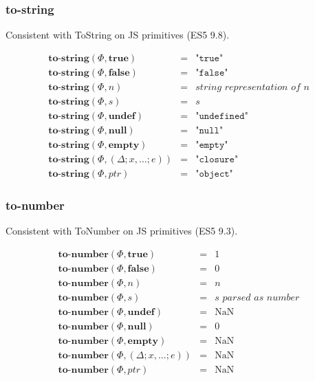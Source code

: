 \documentclass[draft, 10pt]{article}
\newcommand{\expr}[0]{e}
\newcommand{\var}[0]{x}
\newcommand{\num}[0]{n}
\newcommand{\str}[0]{s}
\newcommand{\nan}[0]{\textrm{NaN}}
\newcommand{\undef}[0]{\textbf{undef}}
\newcommand{\nul}[0]{\textbf{null}}
\newcommand{\empt}[0]{\textbf{empty}}
\newcommand{\true}[0]{\textbf{true}}
\newcommand{\false}[0]{\textbf{false}}
\newcommand{\optostr}[0]{\textbf{to-string}}
\newcommand{\optonum}[0]{\textbf{to-number}}
\newcommand{\varenv}[0]{\Delta}
\newcommand{\heap}[0]{\Phi}
\newcommand{\closure}[3]{(#1; #2; #3)}
\newcommand{\heapptr}{ptr}
\newcommand{\rununop}[3]{#1(#2,#3)}
\begin{document}
\subsubsection{to-string}

Consistent with ToString on JS primitives (ES5 9.8).

\[
\begin{array}{rcl}
\rununop{\optostr}{\heap}{\true} &=& \texttt{"true"} \\
\rununop{\optostr}{\heap}{\false} &=& \texttt{"false"} \\
\rununop{\optostr}{\heap}{\num} &=& \textit{string representation of $\num$} \\
\rununop{\optostr}{\heap}{\str} &=& \str \\
\rununop{\optostr}{\heap}{\undef} &=& \texttt{"undefined"} \\
\rununop{\optostr}{\heap}{\nul} &=& \texttt{"null"} \\
\rununop{\optostr}{\heap}{\empt} &=& \texttt{"empty"} \\
\rununop{\optostr}{\heap}{\closure{\varenv}{\var, \dots}{\expr}} &=& \texttt{"closure"} \\
\rununop{\optostr}{\heap}{\heapptr} &=& \texttt{"object"} 
\end{array}
\]

\subsubsection{to-number}

Consistent with ToNumber on JS primitives (ES5 9.3).

\[
\begin{array}{rcl}
\rununop{\optonum}{\heap}{\true} &=& 1 \\
\rununop{\optonum}{\heap}{\false} &=& 0 \\
\rununop{\optonum}{\heap}{\num} &=& \num \\
\rununop{\optonum}{\heap}{\str} &=& \textit{$\str$ parsed as number} \\
\rununop{\optonum}{\heap}{\undef} &=& \nan \\
\rununop{\optonum}{\heap}{\nul} &=& 0 \\
\rununop{\optonum}{\heap}{\empt} &=& \nan \\
\rununop{\optonum}{\heap}{\closure{\varenv}{\var, \dots}{\expr}} &=& \nan \\
\rununop{\optonum}{\heap}{\heapptr} &=& \nan 
\end{array}
\]
\end{document}
